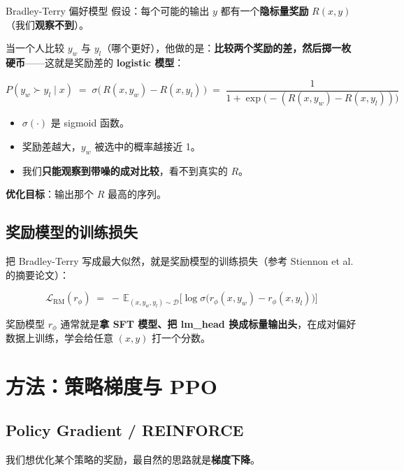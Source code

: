 \documentclass[a4paper]{article}
\begin{document}
\begin{importantbox}{Bradley-Terry 偏好模型}
假设：每个可能的输出 $y$ 都有一个\textbf{隐标量奖励} $R(x,y)$（我们\textbf{观察不到}）。

当一个人比较 $y_w$ 与 $y_l$（哪个更好），他做的是：\textbf{比较两个奖励的差，然后掷一枚硬币}——这就是奖励差的 \textbf{logistic 模型}：

\[
P(y_w \succ y_l \mid x) \;=\; \sigma\!\Big(\,R(x,y_w) - R(x,y_l)\,\Big)
\;=\; \frac{1}{1+\exp\!\big(-(R(x,y_w)-R(x,y_l))\big)}
\]

\begin{itemize}
\item $\sigma(\cdot)$ 是 sigmoid 函数。
\item 奖励差越大，$y_w$ 被选中的概率越接近 1。
\item 我们\textbf{只能观察到带噪的成对比较}，看不到真实的 $R$。
\end{itemize}

\textbf{优化目标}：输出那个 $R$ 最高的序列。
\end{importantbox}

\subsection{奖励模型的训练损失}

把 Bradley-Terry 写成最大似然，就是奖励模型的训练损失（参考 Stiennon et al. 的摘要论文）：

\[
\mathcal{L}_{\mathrm{RM}}(r_\phi) \;=\; -\,\mathbb{E}_{(x,y_w,y_l)\sim\mathcal{D}}
\Big[\log \sigma\!\big(r_\phi(x,y_w) - r_\phi(x,y_l)\big)\Big]
\]

奖励模型 $r_\phi$ 通常就是\textbf{拿 SFT 模型、把 lm\_head 换成标量输出头}，在成对偏好数据上训练，学会给任意 $(x,y)$ 打一个分数。

\section{方法：策略梯度与 PPO}

\subsection{Policy Gradient / REINFORCE}

我们想优化某个策略的奖励，最自然的思路就是\textbf{梯度下降}。
\end{document}
